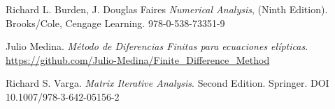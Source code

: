 \documentclass[a4paper]{article}
\begin{document}
\begin{thebibliography}{99}

 Richard L. Burden, J. Douglas Faires \textit{Numerical Analysis}, (Ninth Edition). Brooks/Cole, Cengage Learning. 978-0-538-73351-9

 Julio Medina. \textit{Método de Diferencias Finitas para ecuaciones elípticas}. \url{https://github.com/Julio-Medina/Finite_Difference_Method}

 Richard S. Varga. \textit{Matrix Iterative Analysis}. Second Edition. Springer. DOI 10.1007/978-3-642-05156-2






\end{thebibliography}
\end{document}
